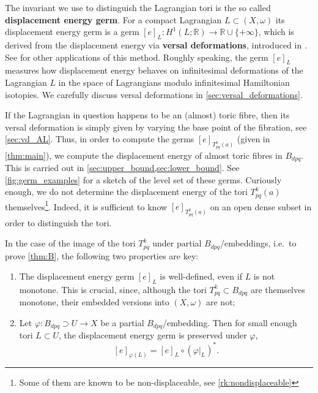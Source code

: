 \documentclass[AIF,Unicode,manuscript]{cedram}
\begin{document}
\medskip

The invariant we use to distinguish the Lagrangian tori is the so called \textbf{displacement energy germ}.
For a compact Lagrangian $L \subset (X,\omega)$ its displacement energy germ is a germ $[e]_L \colon H^1(L;\mathbb{R}) \rightarrow \mathbb{R} \cup \{+\infty\}$, which is derived from  the displacement energy via \textbf{versal deformations}, introduced in \cite{Che96}. See \cite{brendel2020real,brendel2023local,CheSch10} for other applications of this method.
Roughly speaking, the germ $[e]_L$ measures how displacement energy behaves on infinitesimal deformations of the Lagrangian $L$ in the space of Lagrangians modulo infinitesimal Hamiltonian isotopies.
We carefully discuss versal deformations in \cref{sec:versal_deformations}. 

If the Lagrangian in question happens to be an (almost) toric fibre, then its versal deformation is simply given by varying the base point of the fibration, see \cref{sec:vd_AL}. Thus, in order to compute the germs $[e]_{T^k_{pq}(a)}$ (given in \cref{thm:main}), we compute the displacement energy of almost toric fibres in $B_{dpq}$. This is carried out in \cref{sec:upper_bound,sec:lower_bound}. See \cref{fig:germ_examples} for a sketch of the level set of these germs. Curiously enough, we do not determine the displacement energy of the tori $T^{k}_{pq}(a)$ themselves\footnote{Some of them are known to be non-displaceable, see \cref{rk:nondisplaceable}}. Indeed, it is sufficient to know $[e]_{T^k_{pq}(a)}$ on an open dense subset in order to distinguish the tori. 

In the case of the image of the tori $T^k_{pq}$ under partial $B_{dpq}$\-/embeddings, i.e.\ to prove \cref{thm:B}, the following two properties are key:

\begin{enumerate}
    \item The displacement energy germ $[e]_L$ is well-defined, even if $L$ is not monotone.
This is crucial, since, although the tori $T^k_{pq} \subset B_{dpq}$ are themselves monotone, their embedded versions into $(X,\omega)$ are not; 
    \item Let $\varphi \colon B_{dpq} \supset U \rightarrow X$ be a partial $B_{dpq}$\-/embedding.
Then for small enough tori $L \subset U$, the displacement energy germ is preserved under $\varphi$, 
    \begin{equation}
        \label{eq:locality}
        [e]_{\varphi(L)} = [e]_L \circ (\varphi\vert_L)^*.
    \end{equation}
\end{enumerate}
\end{document}
